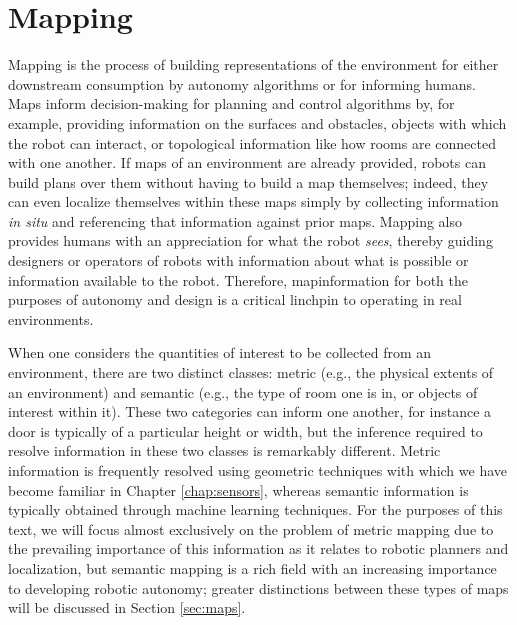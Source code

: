 \chapter{Mapping}
Mapping is the process of building representations of the environment for
either downstream consumption by autonomy algorithms or for informing humans.
Maps inform decision-making for planning and control algorithms by, for
example, providing information on the surfaces and obstacles, objects with
which the robot can interact, or topological information like how rooms are
connected with one another. If maps of an environment are already provided,
robots can build plans over them without having to build a map themselves;
indeed, they can even localize themselves within these maps simply by
collecting information \emph{in situ} and referencing that information against
prior maps. Mapping also provides humans with an appreciation for what the
robot \emph{sees}, thereby guiding designers or operators of robots with
information about what is possible or information available to the robot.
Therefore, mapinformation for both the purposes of autonomy and design is a
critical linchpin to operating in real environments.

When one considers the quantities of interest to be collected from an
environment, there are two distinct classes: metric (e.g., the physical extents
of an environment) and semantic (e.g., the type of room one is in, or objects
of interest within it). These two categories can inform one another, for
instance a door is typically of a particular height or width, but the inference
required to resolve information in these two classes is remarkably different.
Metric information is frequently resolved using geometric techniques with which
we have become familiar in Chapter \ref{chap:sensors}, whereas semantic
information is typically obtained through machine learning techniques. For the
purposes of this text, we will focus almost exclusively on the problem of
metric mapping due to the prevailing importance of this information as it
relates to robotic planners and localization, but semantic mapping is a rich
field with an increasing importance to developing robotic autonomy; 
greater distinctions between these types of maps will be discussed in
Section \ref{sec:maps}.

